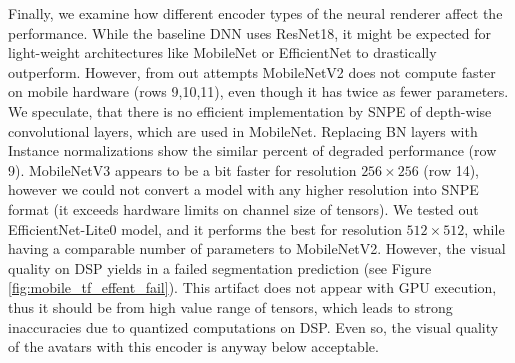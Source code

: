 Finally, we examine how different encoder types of the neural renderer affect the performance. While the baseline DNN uses ResNet18, it might be expected for light-weight architectures like MobileNet or EfficientNet to drastically outperform. However, from out attempts MobileNetV2 does not compute faster on mobile hardware (rows 9,10,11), even though it has twice as fewer parameters. We speculate, that there is no efficient implementation by SNPE of depth-wise convolutional layers, which are used in MobileNet. Replacing BN layers with Instance normalizations show the similar percent of degraded performance (row 9). MobileNetV3 appears to be a bit faster for resolution $256 \times 256$ (row 14), however we could not convert a model with any higher resolution into SNPE format (it exceeds hardware limits on channel size of tensors). We tested out EfficientNet-Lite0 model, and it performs the best for resolution $512 \times 512$, while having a comparable number of parameters to MobileNetV2. However, the visual quality on DSP yields in a failed segmentation prediction (see Figure \ref{fig:mobile_tf_effent_fail}). This artifact does not appear with GPU execution, thus it should be from high value range of tensors, which leads to strong inaccuracies due to quantized computations on DSP. Even so, the visual quality of the avatars with this encoder is anyway below acceptable.
 
